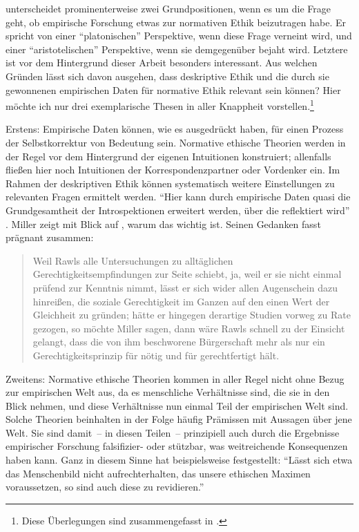 \documentclass[justified,nobib,symmetric,twoside]{tufte-handout}
\begin{document}
\citet[S.~177ff.]{miller_review_1994} unterscheidet prominenterweise zwei Grundpositionen, wenn es um die Frage geht, ob empirische Forschung etwas zur normativen Ethik beizutragen habe.
Er spricht von einer \enquote{platonischen} Perspektive, wenn diese Frage verneint wird, und einer \enquote{aristotelischen} Perspektive, wenn sie demgegenüber bejaht wird.
Letztere ist vor dem Hintergrund dieser Arbeit besonders interessant.
Aus welchen Gründen lässt sich davon ausgehen, dass deskriptive Ethik und die durch sie gewonnenen empirischen Daten für normative Ethik relevant sein können?
Hier möchte ich nur drei exemplarische Thesen in aller Knappheit vorstellen.\footnote{Diese Überlegungen sind zusammengefasst in \citet{bauer_zwei_2019,bauer_two_2020}.}

Erstens: Empirische Daten können, wie es \citet{bar-hillel_judgments_1993} ausgedrückt haben, für einen Prozess der Selbstkorrektur von Bedeutung sein.
Normative ethische Theorien werden in der Regel vor dem Hintergrund der eigenen Intuitionen konstruiert; allenfalls fließen hier noch Intuitionen der Korrespondenzpartner oder Vordenker ein.
Im Rahmen der deskriptiven Ethik können systematisch weitere Einstellungen zu relevanten Fragen ermittelt werden.
\enquote{Hier kann durch empirische Daten quasi die Grundgesamtheit der Introspektionen erweitert werden, über die reflektiert wird} \citep[S.~21]{bauer_zwei_2019}.
Miller zeigt mit Blick auf \citet{rawls_theory_1971}, warum das wichtig ist.
Seinen Gedanken fasst \citet[S.~11]{honneth_philosophie_2008} prägnant zusammen:

\begin{quote}
   Weil Rawls alle Untersuchungen zu alltäglichen Gerechtigkeitsempfindungen zur Seite schiebt, ja, weil er sie nicht einmal prüfend zur Kenntnis nimmt, lässt er sich wider allen Augenschein dazu hinreißen, die soziale Gerechtigkeit im Ganzen auf den einen Wert der Gleichheit zu gründen; hätte er hingegen derartige Studien vorweg zu Rate gezogen, so möchte Miller sagen, dann wäre Rawls schnell zu der Einsicht gelangt, dass die von ihm beschworene Bürgerschaft mehr als nur ein Gerechtigkeitsprinzip für nötig und für gerechtfertigt hält.
\end{quote}

Zweitens: Normative ethische Theorien kommen in aller Regel nicht ohne Bezug zur empirischen Welt aus, da es menschliche Verhältnisse sind, die sie in den Blick nehmen, und diese Verhältnisse nun einmal Teil der empirischen Welt sind.
Solche Theorien beinhalten in der Folge häufig Prämissen mit Aussagen über jene Welt.
Sie sind damit~-- in diesen Teilen~-- prinzipiell auch durch die Ergebnisse empirischer Forschung falsifizier- oder stützbar, was weitreichende Konsequenzen haben kann.
Ganz in diesem Sinne hat beispielsweise \citet[S.~670]{kutschera_empirische_1988} festgestellt: \enquote{Lässt sich etwa das Menschenbild nicht aufrechterhalten, das unsere ethischen Maximen voraussetzen, so sind auch diese zu revidieren.}
\end{document}
